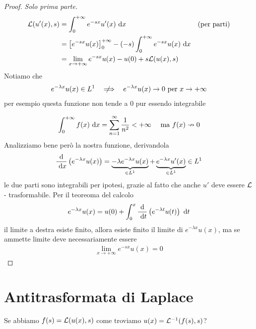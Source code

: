 \begin{proof}\textit{Solo prima parte.}\leavevmode
\begin{align*}
\mathcal{L}(u'(x), s) & = \int^{+ \infty}_{0} e^{- sx} u'(x) \  \mathrm{d} x & \text{(per parti)}\\
 & = \left[e^{- sx} u(x)\right]^{+ \infty}_{0} - (- s)\int^{+ \infty}_{0} e^{- sx} u(x) \  \mathrm{d} x & \\
 & = \lim_{x\rightarrow + \infty} e^{- sx} u(x) - u(0) + s\mathcal{L}(u(x), s) &
\end{align*}
Notiamo che
\begin{equation*}
e^{- \lambda x} u(x) \in L^{1} \ \ \notimplies \ \ e^{- \lambda x} u(x)\rightarrow 0\ \text{per} \ x\rightarrow + \infty
\end{equation*}
per esempio questa funzione non tende a $0$ pur essendo integrabile



\begin{equation*}
\int^{+ \infty}_{0} f(x) \dx = \sum^{\infty}_{n = 1}\frac{1}{n^{2}} < + \infty \ \ \ \ \text{ma} \ f(x) \nrightarrow 0
\end{equation*}
Analizziamo bene però la nostra funzione, derivandola
\begin{equation*}
\frac{\mathrm{d}}{\  \mathrm{d} x}\left(e^{- \lambda x} u(x)\right) = \underbrace{- \lambda e^{- \lambda x} u(x)}_{\in L^{1}} + \underbrace{e^{- \lambda x} u'(x)}_{\in L^{1}} \in L^{1}
\end{equation*}
le due parti sono integrabili per ipotesi, grazie al fatto che anche $u'$ deve essere $\mathcal{L}$ - trasformabile. Per il teoreoma del calcolo
\begin{equation*}
e^{- \lambda x} u(x) = u(0) + \int^{x}_{0}\frac{\mathrm{d}}{\  \mathrm{d} t}\left(e^{- \lambda t} u(t)\right) \  \mathrm{d} t
\end{equation*}
il limite a destra esiste finito, allora esiste finito il limite di $e^{- \lambda x} u(x)$, ma se ammette limite deve necessariamente essere
\begin{gather*}
\lim_{x\rightarrow + \infty} e^{- sx} u(x) = 0
\end{gather*}
\end{proof}

\section{Antitrasformata di Laplace}

Se abbiamo $f(s) = \mathcal{L}(u(x), s)$ come troviamo $u(x) = \mathcal{L}^{- 1}(f(s), s)$?

